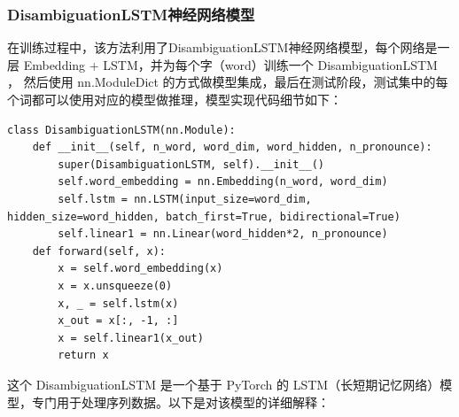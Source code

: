 \documentclass[12pt,hyperref,a4paper,UTF8]{ctexart}
\begin{document}
\subsubsection{DisambiguationLSTM神经网络模型}
在训练过程中，该方法利用了DisambiguationLSTM神经网络模型，每个网络是一层 Embedding + LSTM，并为每个字（word）训练一个 DisambiguationLSTM ， 然后使用 nn.ModuleDict 的方式做模型集成，最后在测试阶段，测试集中的每个词都可以使用对应的模型做推理，模型实现代码细节如下：
\begin{lstlisting}[caption={DisambiguationLSTM神经网络模型实现代码}, label={lst:example}]
class DisambiguationLSTM(nn.Module):
    def __init__(self, n_word, word_dim, word_hidden, n_pronounce):
        super(DisambiguationLSTM, self).__init__()
        self.word_embedding = nn.Embedding(n_word, word_dim)
        self.lstm = nn.LSTM(input_size=word_dim, hidden_size=word_hidden, batch_first=True, bidirectional=True)
        self.linear1 = nn.Linear(word_hidden*2, n_pronounce)
    def forward(self, x):
        x = self.word_embedding(x)
        x = x.unsqueeze(0)
        x, _ = self.lstm(x)
        x_out = x[:, -1, :]
        x = self.linear1(x_out)     
        return x
\end{lstlisting}
这个 DisambiguationLSTM 是一个基于 PyTorch 的 LSTM（长短期记忆网络）模型，专门用于处理序列数据。以下是对该模型的详细解释：
\end{document}

